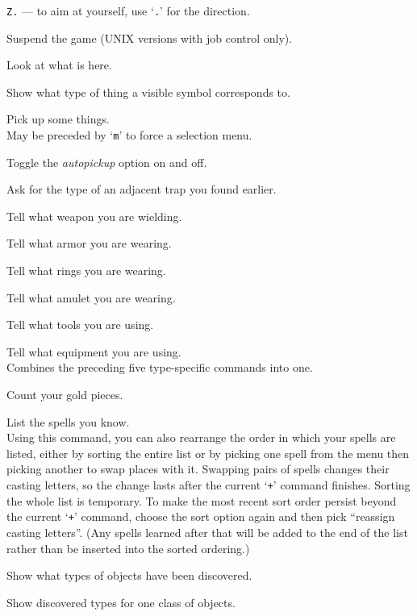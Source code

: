 {\tt Z.} --- to aim at yourself, use `{\tt .}' for the direction.
\item[\tb{\^{}Z}]
Suspend the game (UNIX versions with job control only).
\item[\tb{:}]
Look at what is here.
\item[\tb{;}]
Show what type of thing a visible symbol corresponds to.
\item[\tb{,}]
Pick up some things.\\
May be preceded by `{\tt m}' to force a selection menu.
\item[\tb{@}]
Toggle the {\it autopickup\/} option on and off.
\item[\tb{\^{}}]
Ask for the type of an adjacent trap you found earlier.
\item[\tb{)}]
Tell what weapon you are wielding.
\item[\tb{[}]
Tell what armor you are wearing.
\item[\tb{=}]
Tell what rings you are wearing.
\item[\tb{"}]
Tell what amulet you are wearing.
\item[\tb{(}]
Tell what tools you are using.
\item[\tb{*}]
Tell what equipment you are using.\\
Combines the preceding five type-specific
commands into one.
\item[\tb{\$}]
Count your gold pieces.
\item[\tb{+}]
List the spells you know.\\
Using this command, you can also rearrange
the order in which your spells are listed, either by sorting the entire
list or by picking one spell from the menu then picking another to swap
places with it.  Swapping pairs of spells changes their casting letters,
so the change lasts after the current `{\tt +}' command finishes.  Sorting
the whole list is temporary.  To make the most recent sort order persist
beyond the current `{\tt +}' command, choose the sort option again and then
pick ``reassign casting letters''.  (Any spells learned after that will
be added to the end of the list rather than be inserted into the sorted
ordering.)
\item[\tb{$\backslash$}]
Show what types of objects have been discovered.
\item[\tb{\`}]
Show discovered types for one class of objects.
\item[\tb{!}]
